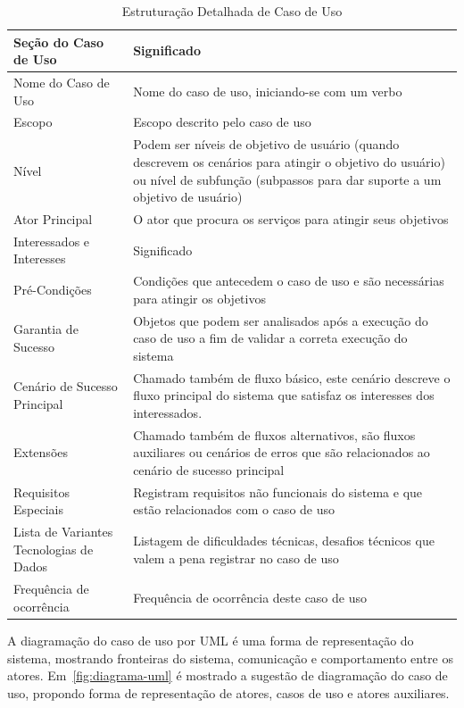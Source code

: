 \begin{table}
	\caption{Estruturação Detalhada de Caso de Uso}
	\begin{tabular}{|p{5cm} | p{9cm}|}
		\hline
		\textbf{Seção do Caso de Uso}	& \textbf{Significado} \\
		\hline
		Nome do Caso de Uso 	& Nome do caso de uso, iniciando-se com um verbo  \\
		\hline
		Escopo	& Escopo descrito pelo caso de uso \\
		\hline
		Nível	& Podem ser níveis de objetivo de usuário (quando descrevem os cenários para atingir o objetivo do usuário) ou nível de subfunção (subpassos para dar suporte a um objetivo de usuário) \\
		\hline
		Ator Principal	& O ator que procura os serviços para atingir seus objetivos  \\
		\hline
		Interessados e Interesses	& Significado  \\
		\hline
		Pré-Condições	& Condições que antecedem o caso de uso e são necessárias para atingir os objetivos \\
		\hline
		Garantia de Sucesso	& Objetos que podem ser analisados após a execução do caso de uso a fim de validar a correta execução do sistema  \\
		\hline
		Cenário de Sucesso Principal	& Chamado também de fluxo básico, este cenário descreve o fluxo principal do sistema que satisfaz os interesses dos interessados.  \\
		\hline
		Extensões	& Chamado também de fluxos alternativos, são fluxos auxiliares ou cenários de erros que são relacionados ao cenário de sucesso principal \\
		\hline
		Requisitos Especiais	& Registram requisitos não funcionais do sistema e que estão relacionados com o caso de uso \\
		\hline
		Lista de Variantes Tecnologias de Dados	& Listagem de dificuldades técnicas, desafios técnicos que valem a pena registrar no caso de uso \\
		\hline
		Frequência de ocorrência	& Frequência de ocorrência deste caso de uso \\
		\hline
	\end{tabular}
	\label{tabela:topicos_uc}
\end{table}

A diagramação do caso de uso por UML é uma forma de representação do sistema, mostrando fronteiras do sistema, comunicação e comportamento entre os atores. Em~\ref{fig:diagrama-uml} é mostrado a sugestão de diagramação do caso de uso, propondo forma de representação de atores, casos de uso e atores auxiliares.

